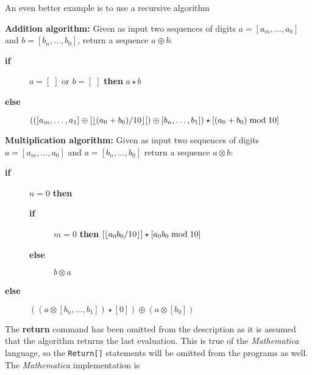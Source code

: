 An even better example is to use a recursive
algorithm

\medskip\noindent
\begin{boxedtext}
\noindent
{\bf Addition algorithm:} Given as input two sequences of
digits $a = [a_m,\ldots,a_0]$ and $b=[b_n,\ldots,b_0]$,
return a sequence $a\oplus b$:

\begin{description}

\item[{\bf if}]
$a=[\;]$ or $b=[\;]$ {\bf then} $a\star b$

\item[{\bf else}]
$
(([a_m,\ldots,a_1]\oplus [\lfloor (a_0+b_0)/10\rfloor])\oplus 
 [b_n, \ldots,b_1]) \star [(a_0+b_0)\;{\rm mod}\; 10]
$
\end{description}
\end{boxedtext}

\medskip\noindent
\begin{boxedtext}
\noindent
{\bf Multiplication algorithm:} Given as input two sequences of
digits $a = [a_m,\ldots,a_0]$ and $a = [b_n,\ldots,b_0]$ return 
a sequence $a\otimes b$: 

\begin{description}

\item[{\bf if}] $n = 0$ {\bf then}

\begin{description}

\item[{\bf if}] $m=0$ {\bf then} 
$[\lfloor a_0 b_0/10\rfloor]\star [a_0 b_0\;{\rm mod}\; 10]$

\item[{\bf else}] $b\otimes a$

\end{description} 

\item[{\bf else}] 
$((a\otimes [b_n,\ldots,b_1])\star [0]) \oplus (a\otimes [b_0])$

\end{description}
\end{boxedtext}

\smallskip\noindent
The  {\bf return} command has been omitted from the description
as it is assumed that the algorithm returns the last evaluation.
This is true of the {\sl Mathematica\/} language, so 
the {\tt Return[]} statements will be omitted from the programs as well.
The {\sl Mathematica\/} implementation is 

